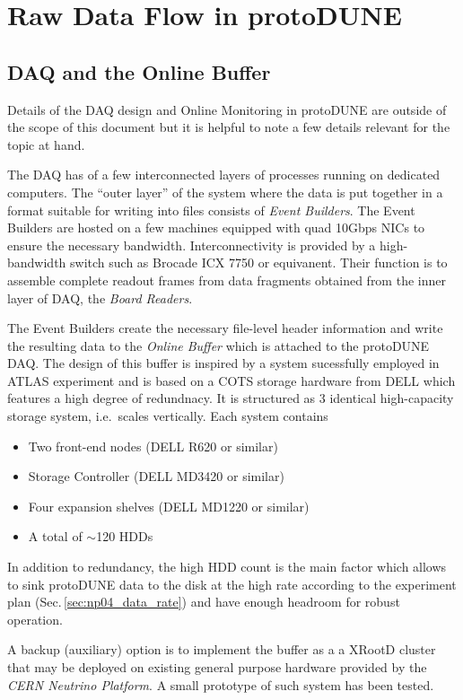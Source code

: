 \documentclass[a4paper]{jpconf}
\newcommand{\pd}{protoDUNE\xspace}
\begin{document}
\section{Raw Data Flow in \pd}
\label{sec:raw_concept}
\subsection{DAQ and the Online Buffer}
Details of the DAQ design and Online Monitoring in \pd are outside of the scope
of this document but it is helpful to note a few details relevant for the topic at hand.

The DAQ has of a few interconnected layers of processes running on dedicated computers.
The ``outer layer'' of the system where the data is put together in a format
suitable for writing into files consists of  \textit{Event Builders}. The Event Builders
are hosted on a few machines equipped with quad 10Gbps NICs to ensure the necessary
bandwidth. Interconnectivity is provided by a high-bandwidth switch such as Brocade ICX 7750
or equivanent. Their function is to assemble complete readout frames from data
fragments obtained from the inner layer of DAQ, the \textit{Board Readers}.

The Event Builders create the necessary file-level header information and write the
resulting data  to the \textit{Online Buffer} which is attached to the \pd DAQ. 
The design of this buffer is inspired by a system sucessfully employed in ATLAS experiment
and is based on a COTS storage hardware from DELL which features a high degree of redundnacy.
It is structured as 3 identical high-capacity storage system, i.e.~scales vertically. Each system contains
\begin{itemize}

\item Two front-end nodes (DELL R620 or similar)
\item Storage Controller (DELL MD3420 or similar)
\item Four expansion shelves (DELL MD1220 or similar)
\item A total of $\sim$120 HDDs
\end{itemize}

\noindent In addition to redundancy, the high HDD count is the main factor which allows
to sink \pd data to the disk at the high rate according to the experiment plan (Sec.\,\ref{sec:np04_data_rate})
and have enough headroom for robust operation.


A backup (auxiliary) option is to implement the buffer as a a XRootD \cite{xrootd} cluster
that may be deployed on existing general purpose hardware provided by the \textit{CERN
Neutrino Platform}\cite{cenf}.
A small prototype of such system has been tested.
\end{document}
